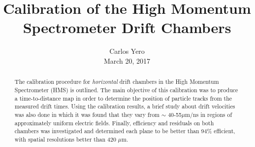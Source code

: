 \documentclass[journal, a4paper]{IEEEtran}
\begin{document}
\title{\huge Calibration of the High Momentum Spectrometer Drift Chambers}
\author{Carlos Yero\\March 20, 2017}
\maketitle
\vspace{1mm}
\begin{abstract}
The calibration procedure for \textit{horizontal} drift chambers in the High Momentum Spectrometer (HMS) is outlined. The main
objective of this calibration was to produce a time-to-distance map in order to determine the position of
particle tracks from the measured drift times. Using the calibration results, a brief study about drift velocities was
also done in which it was found that they vary from $\sim$ 40-55$\mu$m/ns in regions of approximately uniform electric fields.
Finally, efficiency and residuals on both chambers was investigated and determined each plane to be better than
94\% efficient, with spatial resolutions better than 420 $\mu$m.
\end{abstract}
\end{document}
